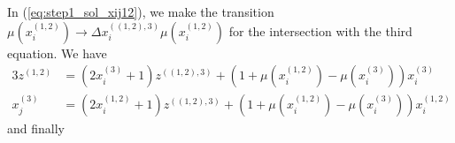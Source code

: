 In (\ref{eq:step1_sol_xij12}), we make the transition $\mu\left(x_{i}^{\left(1,2\right)}\right) \rightarrow \Delta x_{i}^{\left(\left(1,2\right),3\right)}\mu\left(x_{i}^{\left(1,2\right)}\right)$ for the intersection with the third equation. We have
\begin{alignat}{3}
	z^{\left(1,2\right)} &= \left(2x_{i}^{\left(3\right)} + 1\right)z^{\left(\left(1,2\right),3\right)} + \left(1 + \mu\left(x_{i}^{\left(1,2\right)}\right) - \mu\left(x_{i}^{\left(3\right)}\right)\right)x_{i}^{\left(3\right)} \label{eq:step1_sol_z12} \\
	x_{j}^{\left(3\right)} &= \left(2x_{i}^{\left(1,2\right)} + 1\right)z^{\left(\left(1,2\right),3\right)} + \left(1 + \mu\left(x_{i}^{\left(1,2\right)}\right) - \mu\left(x_{i}^{\left(3\right)}\right)\right)x_{i}^{\left(1,2\right)} \label{eq:step1_sol_xj3}
\end{alignat}
and finally
